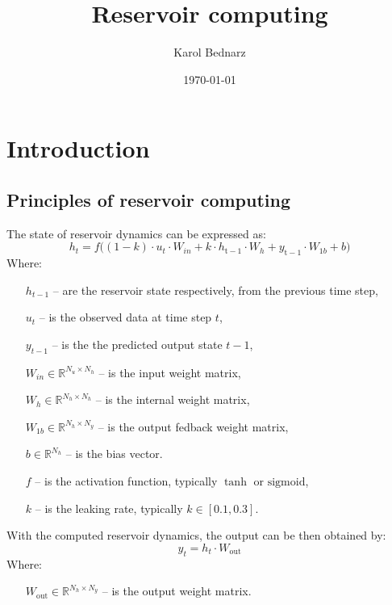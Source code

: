 \documentclass[11pt, oneside]{article}
\title{Reservoir computing}
\author{Karol Bednarz}
\date{\today}
\begin{document}
\maketitle
\tableofcontents

\vspace{.25in}

\newcommand{\Todo}[1]{\textcolor                {red}{\textbf{TODO:} #1}}

\section{Introduction}


\subsection{Principles of reservoir computing}
The state of reservoir dynamics can be expressed as:
\begin{equation}
    h_t = f \big((1-k) \cdot u_t \cdot W_{in} + k\cdot h_{\mathrm{t-1}} \cdot W_h + y_{\mathrm{t-1}} \cdot W_{1b} + b \big)
\end{equation}
Where: 
\begin{itemize}[noitemsep, leftmargin=4cm, label={}]
    \item [$h_{t-1}$] -- are the reservoir state respectively, from the previous time step,
    \item [$u_t$] -- is the observed data at time step $t$,
    \item [$y_{t-1}$] -- is the the predicted output state $t-1$,
    \item [$W_{in} \in \mathbb{R}^{N_u \times N_h}$] -- is the input weight matrix,
    \item [$W_h \in \mathbb{R}^{N_h \times N_h}$] -- is the internal weight matrix,
    \item [$W_{1b} \in \mathbb{R}^{N_h \times N_y}$] -- is the output fedback weight matrix,
    \item [$b \in \mathbb{R}^{N_h}$] -- is the bias vector.
    \item [$f$] -- is the activation function, typically $\tanh$ or $\mathrm{sigmoid}$,
    \item [$k$] -- is the leaking rate, typically $k \in [0.1, 0.3]$.
\end{itemize}


With the computed reservoir dynamics, the output can be then obtained by:
\begin{equation}
    y_t = h_t \cdot W_{\mathrm{out}}
\end{equation}
Where:
\begin{itemize}[noitemsep, leftmargin=4cm, label={}]
    \item [$W_{\mathrm{out}} \in \mathbb{R}^{N_h \times N_y}$] -- is the output weight matrix.
\end{itemize}
\end{document}
